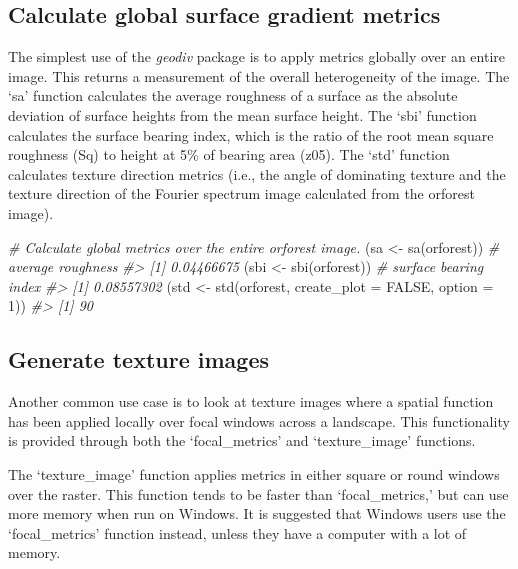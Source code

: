 \documentclass[
]{article}
\newenvironment{Shaded}{\begin{snugshade}}{\end{snugshade}}
\newcommand{\AttributeTok}[1]{\textcolor[rgb]{0.77,0.63,0.00}{#1}}
\newcommand{\CommentTok}[1]{\textcolor[rgb]{0.56,0.35,0.01}{\textit{#1}}}
\newcommand{\ConstantTok}[1]{\textcolor[rgb]{0.00,0.00,0.00}{#1}}
\newcommand{\DecValTok}[1]{\textcolor[rgb]{0.00,0.00,0.81}{#1}}
\newcommand{\FunctionTok}[1]{\textcolor[rgb]{0.00,0.00,0.00}{#1}}
\newcommand{\NormalTok}[1]{#1}
\newcommand{\OtherTok}[1]{\textcolor[rgb]{0.56,0.35,0.01}{#1}}
\begin{document}
\hypertarget{calculate-global-surface-gradient-metrics}{%
\subsection{Calculate global surface gradient
metrics}\label{calculate-global-surface-gradient-metrics}}

The simplest use of the \emph{geodiv} package is to apply metrics
globally over an entire image. This returns a measurement of the overall
heterogeneity of the image. The `sa' function calculates the average
roughness of a surface as the absolute deviation of surface heights from
the mean surface height. The `sbi' function calculates the surface
bearing index, which is the ratio of the root mean square roughness (Sq)
to height at 5\% of bearing area (z05). The `std' function calculates
texture direction metrics (i.e., the angle of dominating texture and the
texture direction of the Fourier spectrum image calculated from the
orforest image).

\begin{Shaded}
\begin{Highlighting}[]
\CommentTok{\# Calculate global metrics over the entire orforest image.}
\NormalTok{(sa }\OtherTok{\textless{}{-}} \FunctionTok{sa}\NormalTok{(orforest)) }\CommentTok{\# average roughness}
\CommentTok{\#\textgreater{} [1] 0.04466675}
\NormalTok{(sbi }\OtherTok{\textless{}{-}} \FunctionTok{sbi}\NormalTok{(orforest)) }\CommentTok{\# surface bearing index}
\CommentTok{\#\textgreater{} [1] 0.08557302}
\NormalTok{(std }\OtherTok{\textless{}{-}} \FunctionTok{std}\NormalTok{(orforest, }\AttributeTok{create\_plot =} \ConstantTok{FALSE}\NormalTok{, }\AttributeTok{option =} \DecValTok{1}\NormalTok{))}
\CommentTok{\#\textgreater{} [1] 90}
\end{Highlighting}
\end{Shaded}

\hypertarget{generate-texture-images}{%
\subsection{Generate texture images}\label{generate-texture-images}}

Another common use case is to look at texture images where a spatial
function has been applied locally over focal windows across a landscape.
This functionality is provided through both the `focal\_metrics' and
`texture\_image' functions.

The `texture\_image' function applies metrics in either square or round
windows over the raster. This function tends to be faster than
`focal\_metrics,' but can use more memory when run on Windows. It is
suggested that Windows users use the `focal\_metrics' function instead,
unless they have a computer with a lot of memory.
\end{document}
